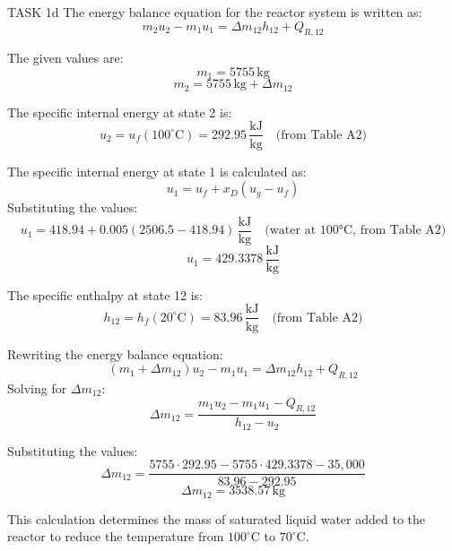 TASK 1d  
The energy balance equation for the reactor system is written as:  
\[
m_2 u_2 - m_1 u_1 = \Delta m_{12} h_{12} + Q_{R,12}
\]  

The given values are:  
\[
m_1 = 5755 \, \text{kg}
\]  
\[
m_2 = 5755 \, \text{kg} + \Delta m_{12}
\]  

The specific internal energy at state 2 is:  
\[
u_2 = u_{f}(100^\circ\text{C}) = 292.95 \, \frac{\text{kJ}}{\text{kg}} \quad \text{(from Table A2)}
\]  

The specific internal energy at state 1 is calculated as:  
\[
u_1 = u_f + x_D (u_g - u_f)
\]  
Substituting the values:  
\[
u_1 = 418.94 + 0.005 (2506.5 - 418.94) \, \frac{\text{kJ}}{\text{kg}} \quad \text{(water at 100°C, from Table A2)}
\]  
\[
u_1 = 429.3378 \, \frac{\text{kJ}}{\text{kg}}
\]  

The specific enthalpy at state 12 is:  
\[
h_{12} = h_f(20^\circ\text{C}) = 83.96 \, \frac{\text{kJ}}{\text{kg}} \quad \text{(from Table A2)}
\]  

Rewriting the energy balance equation:  
\[
(m_1 + \Delta m_{12}) u_2 - m_1 u_1 = \Delta m_{12} h_{12} + Q_{R,12}
\]  
Solving for \( \Delta m_{12} \):  
\[
\Delta m_{12} = \frac{m_1 u_2 - m_1 u_1 - Q_{R,12}}{h_{12} - u_2}
\]  

Substituting the values:  
\[
\Delta m_{12} = \frac{5755 \cdot 292.95 - 5755 \cdot 429.3378 - 35,000}{83.96 - 292.95}
\]  
\[
\Delta m_{12} = 3538.57 \, \text{kg}
\]  

This calculation determines the mass of saturated liquid water added to the reactor to reduce the temperature from \( 100^\circ\text{C} \) to \( 70^\circ\text{C} \).